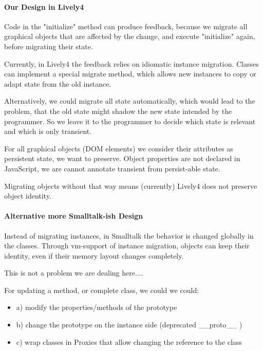 \paragraph{Our Design in Lively4}

Code in the "initialize" method can produce feedback, because we migrate all graphical objects that are affected by the change, and execute "initialize" again, before migrating their state. 

Currently, in Lively4 the feedback relies on idiomatic instance migration. Classes can implement a special migrate method, which allows new instances to copy or adapt state from the old instance. 

Alternatively, we could migrate all state automatically, which would lead to the problem, that the old state might shadow the new state intended by the programmer. So we leave it to the programmer to decide which state is relevant and which is only transient.

For all graphical objects (DOM elements) we consider their attributes as persistent state, we want to preserve. 
Object properties are not declared in JavaScript, we are cannot annotate transient from persist-able state. 

Migrating objects without that way means (currently) Lively4 does not preserve object identity.

\paragraph{Alternative more Smalltalk-ish Design}

Instead of migrating instances, in Smalltalk the behavior is changed globally in the classes. Through vm-support of instance migration, objects can keep their identity, even if their memory layout changes completely. 

This is not a problem we are dealing here.... 

For updating a method, or complete class, we could we could:

\begin{itemize}
  \item a) modify the properties/methods of the prototype 
  \item b) change the prototype on the instance side (deprecated \_\_proto\_\_ )
  \item c) wrap classes in Proxies that allow changing the reference to the class
\end{itemize}

